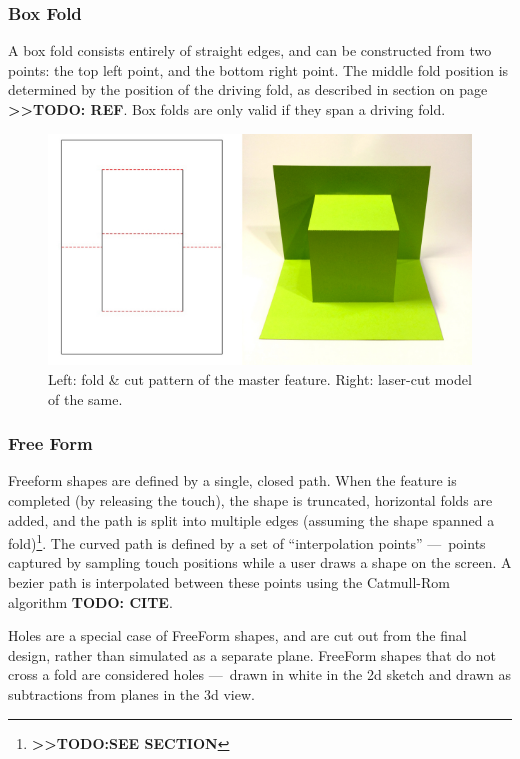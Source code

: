 \subsubsection{Box Fold}\label{box-fold}

A box fold consists entirely of straight edges, and can be constructed
from two points: the top left point, and the bottom right point. The
middle fold position is determined by the position of the driving fold,
as described in section on page
\textbf{\textgreater{}\textgreater{}TODO: REF}. Box folds are only valid
if they span a driving fold.

\begin{figure}[htbp]
\centering
\includegraphics{figures/33_UI_Interface_Data_Structures/box.pdf}
\caption{Left: fold \& cut pattern of the master feature. Right:
laser-cut model of the same.}
\end{figure}

\subsubsection{Free Form}\label{free-form}

Freeform shapes are defined by a single, closed path. When the feature
is completed (by releasing the touch), the shape is truncated,
horizontal folds are added, and the path is split into multiple edges
(assuming the shape spanned a fold)\footnote{\textbf{\textgreater{}\textgreater{}TODO:SEE
  SECTION}}. The curved path is defined by a set of ``interpolation
points'' ---~points captured by sampling touch positions while a user
draws a shape on the screen. A bezier path is interpolated between these
points using the Catmull-Rom algorithm \textbf{TODO: CITE}.

Holes are a special case of FreeForm shapes, and are cut out from the
final design, rather than simulated as a separate plane. FreeForm shapes
that do not cross a fold are considered holes ---~drawn in white in the
2d sketch and drawn as subtractions from planes in the 3d view.

